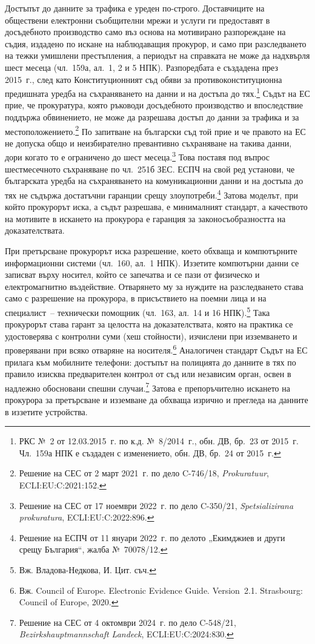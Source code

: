Достъпът до данните за трафика е уреден по-строго. Доставчиците на обществени електронни
съобщителни мрежи и услуги ги предоставят в досъдебното производство само въз основа на
мотивирано разпореждане на съдия, издадено по искане на наблюдаващия прокурор, и само при
разследването на тежки умишлени престъпления, а периодът на справката не може да
надхвърля шест месеца (чл.~159а, ал.~1, 2 и 5 НПК). Разпоредбата е създадена през 2015~г.,
след като Конституционният съд обяви за противоконституционна предишната уредба на
съхраняването на данни и на достъпа до тях.\footnote{РКС №~2 от 12.03.2015~г. по к.д.
№~8/2014~г., обн. ДВ, бр.~23 от 2015~г. Чл.~159а НПК е създаден с изменението, обн. ДВ,
бр.~24 от 2015~г.} Съдът на ЕС прие, че прокуратура, която ръководи досъдебното
производство и впоследствие поддържа обвинението, не може да разрешава достъп до данни за
трафика и за местоположението.\footnote{Решение на СЕС от 2 март 2021~г. по дело C-746/18,
\textit{Prokuratuur}, ECLI:EU:C:2021:152.} По запитване на български съд той прие и че
правото на ЕС не допуска общо и неизбирателно превантивно съхраняване на такива данни,
дори когато то е ограничено до шест месеца.\footnote{Решение на СЕС от 17 ноември 2022~г.
по дело C-350/21, \textit{Spetsializirana prokuratura}, ECLI:EU:C:2022:896.} Това поставя
под въпрос шестмесечното съхраняване по чл.~251б ЗЕС. ЕСПЧ на свой ред установи, че
българската уредба на съхраняването на комуникационни данни и на достъпа до тях не
съдържа достатъчни гаранции срещу злоупотреби.\footnote{Решение на ЕСПЧ от 11 януари
2022~г. по делото „Екимджиев и други срещу България“, жалба №~70078/12.} Затова моделът,
при който прокурорът иска, а съдът разрешава, е минималният стандарт, а качеството на
мотивите в искането на прокурора е гаранция за законосъобразността на доказателствата.

При претърсване прокурорът иска разрешение, което обхваща и компютърните информационни
системи (чл.~160, ал.~1 НПК). Иззетите компютърни данни се записват върху носител, който
се запечатва и се пази от физическо и електромагнитно въздействие. Отварянето му за
нуждите на разследването става само с разрешение на прокурора, в присъствието на поемни
лица и на специалист~-- технически помощник (чл.~163, ал.~14 и 16
НПК).\footnote{Вж. Владова-Недкова, И. Цит. съч.} Така прокурорът става гарант за
целостта на доказателствата, която на практика се удостоверява с контролни суми (хеш
стойности), изчислени при изземването и проверявани при всяко отваряне на
носителя.\footnote{Вж. Council of Europe. Electronic Evidence Guide. Version~2.1.
Strasbourg: Council of Europe, 2020.} Аналогичен стандарт Съдът на ЕС прилага към
мобилните телефони: достъпът на полицията до данните в тях по правило изисква
предварителен контрол от съд или независим орган, освен в надлежно обосновани спешни
случаи.\footnote{Решение на СЕС от 4 октомври 2024~г. по дело C-548/21,
\textit{Bezirkshauptmannschaft Landeck}, ECLI:EU:C:2024:830.} Затова е препоръчително
искането на прокурора за претърсване и изземване да обхваща изрично и прегледа на данните
в иззетите устройства.

